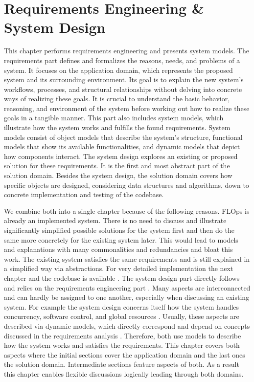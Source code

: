 \chapter{Requirements Engineering \& System Design}

This chapter performs requirements engineering and presents system models.
The requirements part defines and formalizes the reasons, needs, and problems of a system.
It focuses on the application domain, which represents the proposed system and its surrounding environment.
Its goal is to explain the new system's workflows, processes, and structural relationships without delving into concrete ways of realizing these goals.
It is crucial to understand the basic behavior, reasoning, and environment of the system before working out how to realize these goals in a tangible manner.
This part also includes system models, which illustrate how the system works and fulfills the found requirements.
System models consist of object models that describe the system's structure, functional models that show its available functionalities, and dynamic models that depict how components interact.
The system design explores an existing or proposed solution for these requirements.
It is the first and most abstract part of the solution domain.
Besides the system design, the solution domain covers how specific objects are designed, considering data structures and algorithms, down to concrete implementation and testing of the codebase. \cite{book:bruegge}

We combine both into a single chapter because of the following reasons.
FLOps is already an implemented system.
There is no need to discuss and illustrate significantly simplified possible solutions for the system first and then do the same more concretely for the existing system later.
This would lead to models and explanations with many commonalities and redundancies and bloat this work.
The existing system satisfies the same requirements and is still explained in a simplified way via abstractions.
For very detailed implementation the next chapter and the codebase is available \cite{flops_code}.
The system design part directly follows and relies on the requirements engineering part \cite{book:bruegge}.
Many aspects are interconnected and can hardly be assigned to one another, especially when discussing an existing system.
For example the system design concerns itself how the system handles concurrency, software control, and global resources \cite{book:bruegge}.
Usually, these aspects are described via dynamic models, which directly correspond and depend on concepts discussed in the requirements analysis \cite{book:bruegge}.
Therefore, both use models to describe how the system works and satisfies the requirements.
This chapter covers both aspects where the initial sections cover the application domain and the last ones the solution domain.
Intermediate sections feature aspects of both. 
As a result this chapter enables flexible discussions logically leading through both domains.



